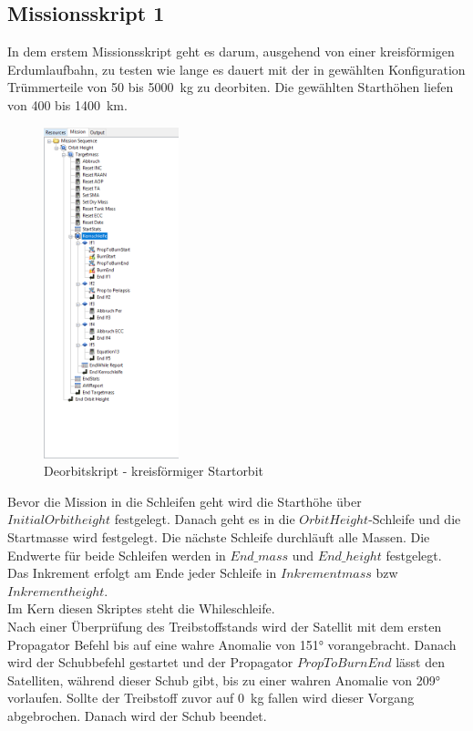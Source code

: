 
\subsection{Missionsskript 1}

	In dem erstem Missionsskript geht es darum, ausgehend von einer kreisförmigen Erdumlaufbahn, zu testen wie lange es dauert mit der in  gewählten Konfiguration Trümmerteile von \num{50} bis \SI{5000}{\kilo\gram} zu deorbiten. Die gewählten Starthöhen liefen von \num{400} bis \SI{1400}{\kilo\metre}.

\begin{figure}[!h]
	\centering
		\includegraphics[width=0.35\textwidth]{graphics/GMAT/GMAT_Skript_Kreis.PNG}
		\caption{Deorbitskript - kreisförmiger Startorbit}
			\label{fig:GMAT_Skript_Kreis}
\end{figure}


	Bevor die Mission in die Schleifen geht wird die Starthöhe über $Initial Orbitheight$ festgelegt. Danach geht es in die $Orbit Height$-Schleife und die Startmasse wird festgelegt.
Die nächste Schleife durchläuft alle Massen. Die Endwerte für beide Schleifen werden in $End\_mass$ und $End\_height$ festgelegt. Das Inkrement erfolgt am Ende jeder Schleife in $Inkrement mass$ bzw $Inkrement height$.\\
Im Kern diesen Skriptes steht die Whileschleife.\\
Nach einer Überprüfung des Treibstoffstands wird der Satellit mit dem ersten Propagator Befehl bis auf eine wahre Anomalie von \num{151}° vorangebracht. 
Danach wird der Schubbefehl gestartet und der Propagator $PropToBurnEnd$ lässt den Satelliten, während dieser Schub gibt, bis zu einer wahren Anomalie von \num{209}° vorlaufen. Sollte der Treibstoff zuvor auf \SI{0}{\kilogram} fallen wird dieser Vorgang abgebrochen. Danach wird der Schub beendet.

